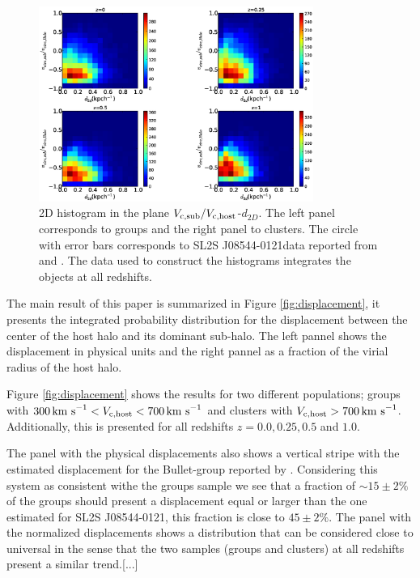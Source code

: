 \documentclass{emulateapj}
\newcommand{\kms}{{\ifmmode{{\mathrm{\,km\ s}^{-1}}}\else{\,km~s$^{-1}$}\fi}}
\newcommand{\bullg}{SL2S J08544-0121}
\begin{document}
\begin{figure}
\begin{center}
\includegraphics[width=0.8\textwidth]{Figures_eps/figure_4_VcircsubVcirchalo_300kms_700kms.eps} 
\end{center}
\caption{2D histogram in the plane $V_{\rm c,sub}/V_{\rm
    c,host}$-$d_{2D}$. The left panel corresponds to groups and the
  right panel to clusters. The circle with error bars corresponds to
  \bullg data reported from \citet{2013A&A...552A..80M} and
  \citet{Gastaldello}. The data used to construct the histograms
  integrates the objects at all redshifts. }
\label{fig:mass_displacement}
\end{figure}




The main result of this paper is summarized in Figure
\ref{fig:displacement}, it presents the integrated
probability distribution for the displacement between the center of
the host halo and its dominant sub-halo. The left pannel shows
the displacement in physical units and the right pannel as a fraction
of the virial radius of the host halo. 

Figure \ref{fig:displacement} shows the results for two different
populations; groups with $300\kms < V_{\rm c, host}<700\kms$ and
clusters with $V_{\rm c,host}>700\kms$. Additionally, this is
presented for all redshifts $z=0.0, 0.25, 0.5$ and $1.0$. 

The panel with the physical displacements also shows a vertical stripe
with the estimated displacement for the Bullet-group reported by
\cite{Gastaldello}. Considering this system as consistent withe the
groups sample we see that a fraction of $\sim 15\pm 2\%$ of the groups
should present a displacement equal or larger than the one estimated
for \bullg, this fraction is close to $45\pm2\% $. The panel with the
normalized displacements shows a  distribution that can be considered
close to universal in the sense that the two samples (groups and
clusters) at all redshifts present a similar trend.[...]
\end{document}
